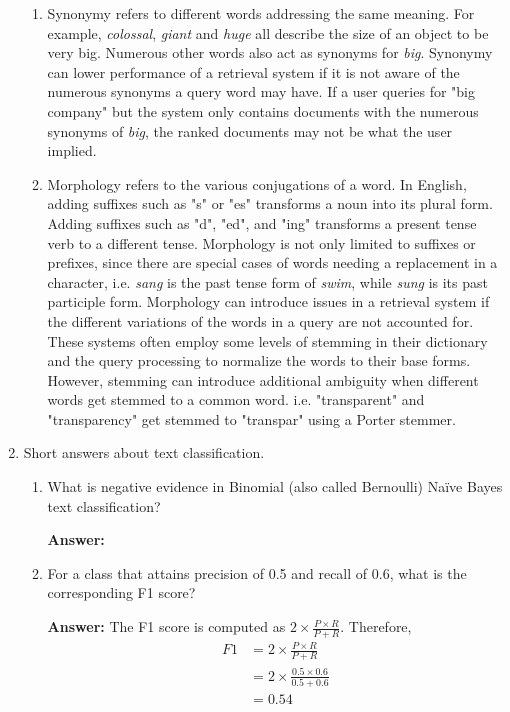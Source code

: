 \documentclass[11pt]{article}
\begin{document}
\begin{enumerate}
\begin{enumerate}
          \item Synonymy refers to different words addressing the same meaning. For example, \textit{colossal}, \textit{giant} and \textit{huge} all describe the size of an object to be very big. Numerous other words also act as synonyms for \textit{big}.
                Synonymy can lower performance of a retrieval system if it is not aware of the numerous synonyms a query word may have. If a user queries for "big company" but the system only contains documents with the numerous synonyms of \textit{big}, the ranked documents may not be what the user implied.

          \item Morphology refers to the various conjugations of a word. In English, adding suffixes such as "s" or "es" transforms a noun into its plural form. Adding suffixes such as "d", "ed", and "ing" transforms a present tense verb to a different tense. Morphology is not only limited to suffixes or prefixes, since there are special cases of words needing a replacement in a character, i.e. \textit{sang} is the past tense form of \textit{swim}, while \textit{sung} is its past participle form.
                Morphology can introduce issues in a retrieval system if the different variations of the words in a query are not accounted for. These systems often employ some levels of stemming in their dictionary and the query processing to normalize the words to their base forms. However, stemming can introduce additional ambiguity when different words get stemmed to a common word. i.e. "transparent" and "transparency" get stemmed to "transpar" using a Porter stemmer.
        \end{enumerate}

  \item Short answers about text classification.
        \begin{enumerate}
          \item What is negative evidence in Binomial (also called Bernoulli) Naïve Bayes text classification?

                \textbf{Answer:}

          \item For a class that attains precision of 0.5 and recall of 0.6, what is the corresponding F1 score?

                \textbf{Answer:} The F1 score is computed as $2 \times \frac{P\times R}{P+R}$. Therefore,
                \begin{align*}
                  F1 & = 2 \times \frac{P\times R}{P+R}         \\
                     & = 2 \times \frac{0.5\times 0.6}{0.5+0.6} \\
                     & = 0.54
                \end{align*}


\end{enumerate}
\end{enumerate}
\end{document}
